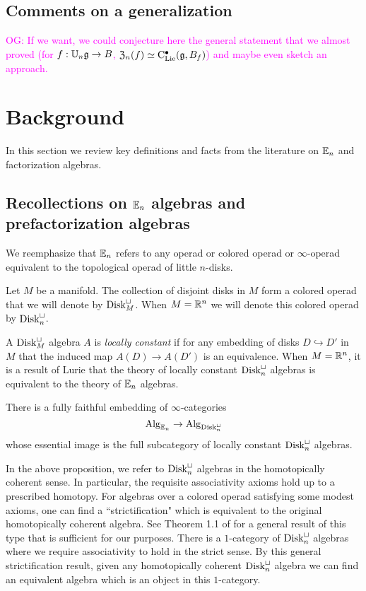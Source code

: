 \documentclass[11pt]{amsart}
\numberwithin{equation}{section}
\def\owen{\textcolor{magenta}{OG: }\textcolor{magenta}}
\begin{document}
\subsection{Comments on a generalization}

\owen{If we want, we could conjecture here the general statement that we almost proved (for $f: \mathbb U_n \mathfrak g \to B$, $\frak{Z}_n(f) \simeq {\rm C}_{\rm Lie}^\bullet(\mathfrak g, B_f)$) and maybe even sketch an approach.}

\section{Background}
\label{sec: background}

In this section we review key definitions and facts from the literature on $\mathbb E_n$ and factorization algebras.

\subsection{Recollections on $\mathbb E_n$ algebras and prefactorization algebras}
\label{sec: en background}

We reemphasize that $\mathbb E_n$ refers to any operad or colored operad or $\infty$-operad equivalent to the topological operad of little $n$-disks. 

Let $M$ be a manifold. 
The collection of disjoint disks in $M$ form a colored operad that we will denote by ${\rm Disk}^\sqcup_M$. 
When $M = \mathbb R^n$ we will denote this colored operad by ${\rm Disk}^{\sqcup}_n$. 

A ${\rm Disk}^\sqcup_M$ algebra $A$ is {\em locally constant} if for any embedding of disks $D \hookrightarrow D'$ in $M$ that the induced map $A(D) \to A(D')$ is an equivalence. 
When $M = \mathbb R^n$, it is a result of Lurie that the theory of locally constant ${\rm Disk}^\sqcup_n$ algebras is equivalent to the theory of $\mathbb E_n$ algebras. 

\begin{thm}
\label{thm:lurie1} 
There is a fully faithful embedding of $\infty$-categories
\[
{\rm Alg}_{\mathbb E_n} \to {\rm Alg}_{{\rm Disk}^\sqcup_n}
\]
whose essential image is the full subcategory of locally constant ${\rm Disk}^\sqcup_n$ algebras. 
\end{thm}

In the above proposition, we refer to ${\rm Disk}^\sqcup_n$ algebras in the homotopically coherent sense. 
In particular, the requisite associativity axioms hold up to a prescribed homotopy.
For algebras over a colored operad satisfying some modest axioms, one can find a ``strictification" which is equivalent to the original homotopically coherent algebra.
See Theorem 1.1 of \cite{PavlovRectify} for a general result of this type that is sufficient for our purposes. 
There is a $1$-category of ${\rm Disk}^\sqcup_n$ algebras where we require associativity to hold in the strict sense. 
By this general strictification result, given any homotopically coherent ${\rm Disk}^{\sqcup}_n$ algebra we can find an equivalent algebra which is an object in this $1$-category. 
\end{document}
